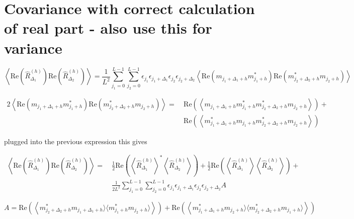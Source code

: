 \documentclass[18pt,a4paper]{extarticle}
\renewcommand{\Re}{\mathrm{Re}}
\begin{document}
\section{Covariance with correct calculation of real part - also use this for variance}

\begin{equation}
\left \langle
\Re\left(\hat{R}^{(h)}_{\Delta_1}\right)
\Re\left(\hat{R}^{(h)}_{\Delta_2}\right)
\right \rangle =
\frac{1}{L^2}\sum^{L-1}_{j_1=0}\sum^{L-1}_{j_2=0}
\epsilon_{j_1} \epsilon_{j_1 + \Delta_1}
\epsilon_{j_2} \epsilon_{j_2 + \Delta_2}
\left\langle
\Re\left(m_{j_1 + \Delta_1 + h} m_{j_1 + h}^*\right)
\Re\left(m_{j_2 + \Delta_2 + h}^* m_{j_2 + h}\right)
\right\rangle
\end{equation}

\begin{equation*}
\begin{split}
2\left\langle
\Re\left(m_{j_1 + \Delta_1 + h}m_{j_1 + h}^*\right)
\Re\left(m_{j_2 + \Delta_2 + h}^* m_{j_2 + h}\right)
\right\rangle
= \: &
\Re\left(\left\langle m_{j_1 + \Delta_1 + h} m_{j_1 + h}^* m_{j_2 + \Delta_2 + h}^* m_{j_2 + h}\right\rangle\right)+ \\&
\Re\left(\left\langle m_{j_1 + \Delta_1 + h}^* m_{j_1 + h} m_{j_2 + \Delta_2 + h}^* m_{j_2 + h}\right\rangle\right)
\end{split}
\end{equation*}

plugged into the previous expression this gives

\begin{equation*}
\begin{split}
\left \langle
\Re\left(\hat{R}^{(h)}_{\Delta_1}\right)
\Re\left(\hat{R}^{(h)}_{\Delta_2}\right)
\right \rangle = \: &
\frac{1}{2}\Re\left(\left\langle\hat{R}^{(h)}_{\Delta_1}\right\rangle^* \left\langle\hat{R}^{(h)}_{\Delta_2} \right\rangle\right)+
\frac{1}{2}\Re\left(\left\langle\hat{R}^{(h)}_{\Delta_1}\right\rangle \left\langle\hat{R}^{(h)}_{\Delta_2} \right\rangle\right)+ \\&
\frac{1}{2L^2}\sum^{L-1}_{j_1=0}\sum^{L-1}_{j_2=0}
\epsilon_{j_1} \epsilon_{j_1 + \Delta_1}
\epsilon_{j_2} \epsilon_{j_2 + \Delta_2}
A
\end{split}
\end{equation*}

\begin{equation*}
A = \Re\left(\left
\langle m_{j_2 + \Delta_2 + h}^* m_{j_1 + \Delta_1 + h} \rangle
\langle m_{j_1 + h}^* m_{j_2 + h} \rangle
\right\rangle\right) +
\Re\left(\left
\langle m_{j_1 + \Delta_1 + h}^* m_{j_2 + h} \rangle
\langle m_{j_2 + \Delta_2 + h}^* m_{j_1 + h} \rangle
\right\rangle\right)
\end{equation*}
\end{document}
